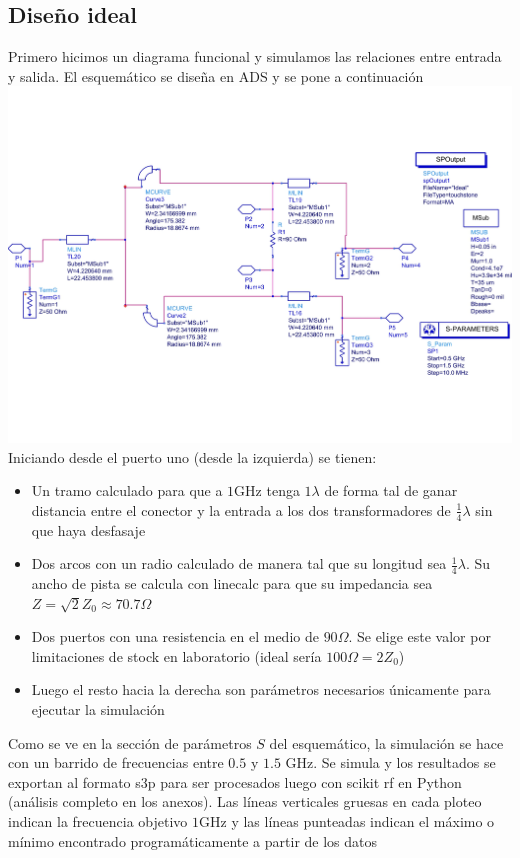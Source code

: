 \documentclass[a4paper, 12pt]{article}
\begin{document}
\subsection{Diseño ideal}
Primero hicimos un diagrama funcional y simulamos las relaciones entre entrada y salida.
El esquemático se diseña en ADS y se pone a continuación
\includegraphics[width = 0.9\linewidth]{./img/ideal.jpg}
Iniciando desde el puerto uno (desde la izquierda) se tienen:

\begin{itemize}
    \item Un tramo calculado para que a $1\text{GHz}$ tenga $1\lambda$ de forma tal de ganar distancia entre el conector y la entrada a los dos transformadores de $\frac{1}{4}\lambda$ sin que haya desfasaje
    \item Dos arcos con un radio calculado de manera tal que su longitud sea $\frac{1}{4}\lambda$. Su ancho de pista se calcula con linecalc para que su impedancia sea $Z = \sqrt{2}Z_0 \approx 70.7\Omega$
    \item Dos puertos con una resistencia en el medio de $90\Omega$. Se elige este valor por limitaciones de stock en laboratorio (ideal sería $100\Omega = 2Z_0$)
    \item Luego el resto hacia la derecha son parámetros necesarios únicamente para ejecutar la simulación
\end{itemize}
Como se ve en la sección de parámetros $S$ del esquemático, la simulación se hace con un barrido de frecuencias entre $0.5$ y $1.5 \text{ GHz}$. Se simula y los resultados se exportan al formato s3p para ser procesados luego con scikit rf en Python (análisis completo en los anexos).
Las líneas verticales gruesas en cada ploteo indican la frecuencia objetivo $1\text{GHz}$ y las líneas punteadas indican el máximo o mínimo encontrado programáticamente a partir de los datos
\end{document}
